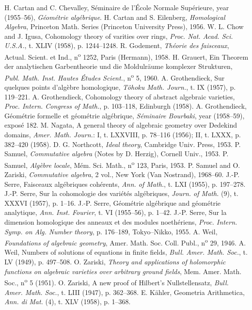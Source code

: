 \documentclass[10pt,oneside]{amsart}
\begin{document}
\renewcommand\refname{Bibliography}
\begin{thebibliography}{22}
H. Cartan and C. Chevalley,
S{\'e}minaire de l'{\'E}cole Normale Sup{\'e}rieure,
 year (1955--56),
\emph{G{\'e}om{\'e}trie alg{\'e}brique}.
H. Cartan and S. Eilenberg,
\emph{Homological Algebra},
Princeton Math. Series (Princeton University Press),
1956.
W. L. Chow and J. Igusa,
Cohomology theory of varities over rings,
\emph{Proc. Nat. Acad. Sci. U.S.A.},
t. XLIV (1958),
p. 1244--1248.
R. Godement,
\emph{Th{\'e}orie des faisceaux},
Actual. Scient. et Ind.,
n\textsuperscript{o} 1252,
Paris (Hermann),
1958.
H. Grauert,
Ein Theorem der analytischen Garbentheorie und die Moldulr{\"a}ume komplexer Strukturen,
\emph{Publ. Math. Inst. Hautes {\'E}tudes Scient.},
n\textsuperscript{o} 5,
1960.
A. Grothendieck,
Sur quelques points d'alg{\`e}bre homologique,
\emph{T{\^o}hoku Math. Journ.},
t. IX (1957),
p. 119--221.
A. Grothendieck,
Cohomology theory of abstract algebraic varieties,
\emph{Proc. Intern. Congress of Math.},
p. 103--118,
Edinburgh (1958).
A. Grothendieck,
G{\'e}om{\'e}trie formelle et g{\'e}om{\'e}trie alg{\'e}brique,
\emph{S{\'e}minaire Bourbaki},
 year (1958--59),
expos{\'e} 182.
M. Nagata,
A general theory of algebraic geometry over Dedekind domains,
\emph{Amer. Math. Journ.}:
I,
t. LXXVIII,
p. 78--116 (1956);
II,
t. LXXX,
p. 382--420 (1958).
D. G. Northcott,
\emph{Ideal theory},
Cambridge Univ. Press,
1953.
P. Samuel,
\emph{Commutative algebra} (Notes by D. Herzig),
Cornell Univ.,
1953.
P. Samuel,
\emph{Alg{\`e}bre locale},
M{\'e}m. Sci. Math.,
n\textsuperscript{o} 123,
Paris,
1953.
P. Samuel and O. Zariski,
\emph{Commutative algebra},
2 vol.,
New York (Van Nostrand),
1968--60.
J.-P. Serre,
Faisceaux alg{\'e}briques coh{\'e}rents,
\emph{Ann. of Math.},
t. LXI (1955),
p. 197--278.
J.-P. Serre,
Sur la cohomologie des vari{\'e}t{\'e}s alg{\'e}briques,
\emph{Journ. of Math.} (9),
t. XXXVI (1957),
p. 1--16.
J.-P. Serre,
G{\'e}om{\'e}trie alg{\'e}brique and g{\'e}om{\'e}trie analytique,
\emph{Ann. Inst. Fourier},
t. VI (1955--56),
p. 1--42.
J.-P. Serre,
Sur la dimension homologique des anneaux et des modules noeth{\'e}riens,
\emph{Proc. Intern. Symp. on Alg. Number theory},
p. 176--189,
Tokyo--Nikko,
1955.
A. Weil,
\emph{Foundations of algebraic geometry},
Amer. Math. Soc. Coll. Publ.,
n\textsuperscript{o} 29,
1946.
A. Weil,
Numbers of solutions of equations in finite fields,
\emph{Bull. Amer. Math. Soc.},
t. LV (1949),
p. 497--508.
O. Zariski,
\emph{Theory and applications of holomorphic functions on algebraic varieties over arbitrary ground fields},
Mem. Amer. Math. Soc.,
n\textsuperscript{o} 5 (1951).
O. Zariski,
A new proof of Hilbert's Nullstellensatz,
\emph{Bull. Amer. Math. Soc.},
t. LIII (1947),
p. 362--368.
E. K{\"a}hler,
Geometria Arithmetica,
\emph{Ann. di Mat.} (4),
t. XLV (1958),
p. 1--368.
\end{thebibliography}
\end{document}

